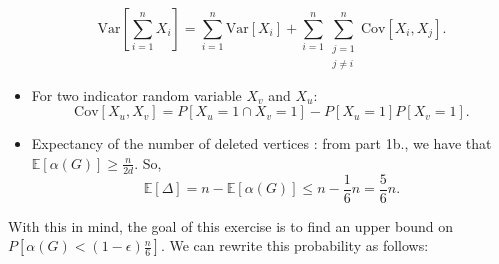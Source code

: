 \documentclass[10pt]{article}
\newenvironment{exercise}[2][Exercise]{\begin{trivlist}
  \item[\hskip \labelsep {\bfseries #1}\hskip \labelsep {\bfseries #2.}]}{\end{trivlist}}
\begin{document}
\begin{exercise}{1c}
\begin{itemize}
\begin{equation}
 \label{eq:varprop2}
\mathrm{Var}\left[\sum_{i=1}^{n} X_i\right] = \sum_{i=1}^{n}\mathrm{Var}[X_i] + \sum_{i = 1}^{n} \sum_{\substack{j=1 \\ j\neq i}}^{n}\mathrm{Cov}[X_i, X_j].
 \end{equation}
 \item For two indicator random variable $X_v$ and $X_u$:
    \begin{equation}
 \label{eq:covprop}
\mathrm{Cov}[X_u,X_v] = P[X_u=1 \cap X_v=1] -  P[X_u=1] P[X_v=1].
 \end{equation}
 \item Expectancy of the number of deleted vertices : from part 1b., we have that $\mathbb{E}[\alpha(G)] \geq \frac{n}{2d}$. So,
 \begin{equation}
 \label{eq:deltaexpectation2}
 \mathbb{E}[\Delta] = n - \mathbb{E}[\alpha(G)]\leq  n - \frac{1}{6}n = \frac{5}{6}n.
 \end{equation}
 \end{itemize}
 With this in mind, the goal of this exercise is to find an upper bound on \\ ${P[\alpha(G) < (1-\epsilon)\frac{n}{6}]}$. We can rewrite this probability as follows:


\end{exercise}
\end{document}
